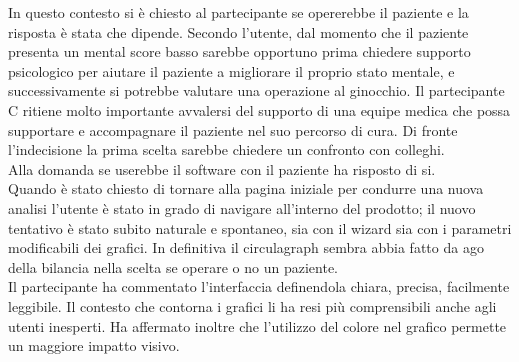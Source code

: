 In questo contesto si è chiesto al partecipante se opererebbe il paziente e la risposta è stata che dipende. Secondo l'utente, dal momento che il paziente presenta un mental score basso sarebbe opportuno prima chiedere supporto psicologico per aiutare il paziente a migliorare il proprio stato mentale, e successivamente si potrebbe valutare una operazione al ginocchio. Il partecipante C ritiene molto importante avvalersi del supporto di una equipe medica che possa supportare e accompagnare il paziente nel suo percorso di cura. Di fronte l'indecisione la prima scelta sarebbe chiedere un confronto con colleghi. \\
Alla domanda se userebbe il software con il paziente ha risposto di si. \\
Quando è stato chiesto di tornare alla pagina iniziale per condurre una nuova analisi l'utente è stato in grado di navigare all'interno del prodotto; il nuovo tentativo è stato subito naturale e spontaneo, sia con il wizard sia con i parametri modificabili dei grafici. In definitiva il circulagraph sembra abbia fatto da ago della bilancia nella scelta se operare o no un paziente. \\
Il partecipante ha commentato l'interfaccia definendola chiara, precisa, facilmente leggibile. Il contesto che contorna i grafici li ha resi più comprensibili anche agli utenti inesperti. Ha affermato inoltre che l'utilizzo del colore nel grafico permette un maggiore impatto visivo. 